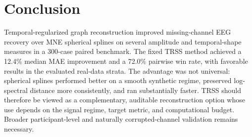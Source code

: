 \section{Conclusion}
Temporal-regularized graph reconstruction improved missing-channel EEG recovery over MNE spherical splines on several amplitude and temporal-shape measures in a 300-case paired benchmark. The fixed TRSS method achieved a 12.4\% median MAE improvement and a 72.0\% pairwise win rate, with favorable results in the evaluated real-data strata. The advantage was not universal: spherical splines performed better on a smooth synthetic regime, preserved log-spectral distance more consistently, and ran substantially faster. TRSS should therefore be viewed as a complementary, auditable reconstruction option whose use depends on the signal regime, target metric, and computational budget. Broader participant-level and naturally corrupted-channel validation remains necessary.